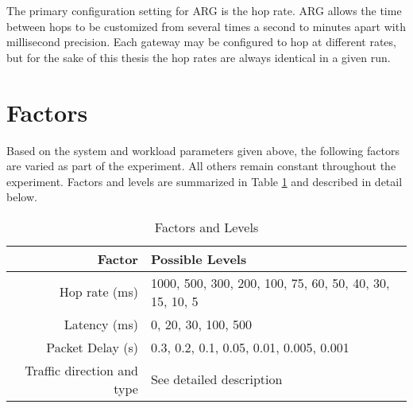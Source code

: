 \par The primary configuration setting for \ac{ARG} is the hop rate. \ac{ARG} allows the time between hops to be customized from several times a second to minutes apart with millisecond precision. Each gateway may be configured to hop at different rates, but for the sake of this thesis the hop rates are always identical in a given run.

\section{Factors}
\FloatBarrier
\label{sec:factors}
\par Based on the system and workload parameters given above, the following factors are varied as part of the experiment. All others remain constant throughout the experiment. Factors and levels are summarized in Table \ref{tbl:factors} and described in detail below.

\begin{table}
\begin{center}
	\caption{Factors and Levels}
	\label{tbl:factors}
	
	\begin{tabular}{r|l}
	Factor & Possible Levels \\
	\hline
	Hop rate (ms) & 1000, 500, 300, 200, 100, 75, 60, 50, 40, 30, 15, 10, 5\\
	Latency (ms) & 0, 20, 30, 100, 500\\
	Packet Delay (s) & 0.3, 0.2, 0.1, 0.05, 0.01, 0.005, 0.001\\
	Traffic direction and type & See detailed description
	\end{tabular}
\end{center}
\end{table}

